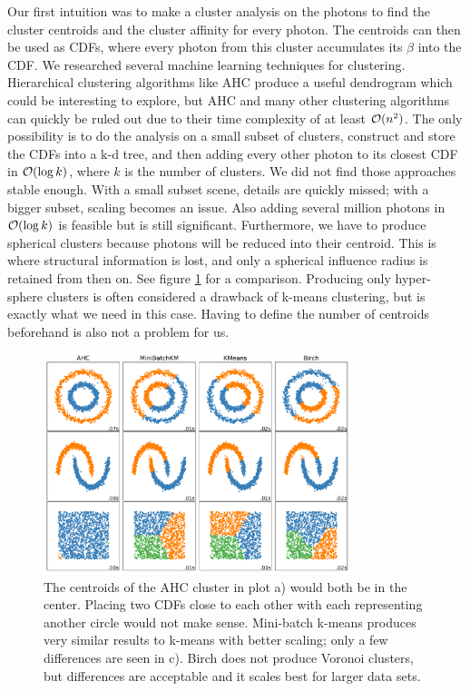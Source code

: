 Our first intuition was to make a cluster analysis on the photons to find the cluster centroids and the cluster affinity for every photon. The centroids can then be used as CDFs, where every photon from this cluster accumulates its $\beta$ into the CDF. We researched several machine learning techniques for clustering. Hierarchical clustering algorithms like AHC produce a useful dendrogram which could be interesting to explore, but AHC and many other clustering algorithms can quickly be ruled out due to their time complexity of at least $\mathcal{O}(n^2)$. The only possibility is to do the analysis on a small subset of clusters, construct and store the CDFs into a k-d tree, and then adding every other photon to its closest CDF in $\mathcal{O}(\log k)$, where $k$ is the number of clusters. We did not find those approaches stable enough. With a small subset scene, details are quickly missed; with a bigger subset, scaling becomes an issue. Also adding several million photons in $\mathcal{O}(\log k)$ is feasible but is still significant. Furthermore, we have to produce spherical clusters because photons will be reduced into their centroid. This is where structural information is lost, and only a spherical influence radius is retained from then on. See figure \ref{fig:clustering} for a comparison. Producing only hyper-sphere clusters is often considered a drawback of k-means clustering, but is exactly what we need in this case. Having to define the number of centroids beforehand is also not a problem for us.

\begin{figure}
    \centering
    \includegraphics[width=0.8\textwidth]{figures/plots/mlclustering.pdf}
    \caption{The centroids of the AHC cluster in plot a) would both be in the center. Placing two CDFs close to each other with each representing another circle would not make sense. Mini-batch k-means produces very similar results to k-means with better scaling; only a few differences are seen in c). Birch does not produce Voronoi clusters, but differences are acceptable and it scales best for larger data sets.}
    \label{fig:clustering}
\end{figure}
    
